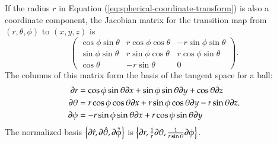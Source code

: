 \documentclass[11pt, a4paper]{book}
\begin{document}
\begin{Example}
  \label{exam:ball-coordinate-basis}
  If the radius $r$ in Equation (\ref{eq:spherical-coordinate-transform}) is also a
  coordinate component, the Jacobian matrix for the transition map from $(r,\theta,\phi)$
  to $(x,y,z)$ is
  \begin{equation}
    \label{eq:ball-coordinate-jacobian-matrix}
    \begin{pmatrix}
      \cos\phi \sin\theta & r\cos\phi \cos\theta & -r\sin\phi \sin\theta \\
      \sin\phi \sin\theta & r \sin\phi \cos\theta & r\cos\phi \sin\theta \\
      \cos\theta & -r\sin\theta & 0
    \end{pmatrix}.
  \end{equation}
  The columns of this matrix form the basis of the tangent space for a ball:
  \begin{equation}
    \begin{aligned}
      \boldsymbol{\partial}r &= \cos\phi \sin\theta \boldsymbol{\partial}x + \sin\phi \sin\theta
      \boldsymbol{\partial}y + \cos\theta \boldsymbol{\partial}z \\
      \boldsymbol{\partial}\theta &= r\cos\phi\cos\theta \boldsymbol{\partial}x + r\sin\phi\cos\theta
      \boldsymbol{\partial}y - r\sin\theta \boldsymbol{\partial}z \\
      \boldsymbol{\partial}\phi &= -r\sin\phi \sin\theta \boldsymbol{\partial}x + r\cos\phi \sin\theta
      \boldsymbol{\partial}y
    \end{aligned}.
  \end{equation}
  The normalized basis
  $\left\{ \boldsymbol{\partial}\hat{r}, \boldsymbol{\partial}\hat{\theta}, \boldsymbol{\partial}\hat{\phi}
  \right\}$ is
  $\left\{ \boldsymbol{\partial}r, \frac{1}{r} \boldsymbol{\partial}\theta, \frac{1}{r\sin\theta}
    \boldsymbol{\partial}\phi \right\}$.
\end{Example}
\end{document}
